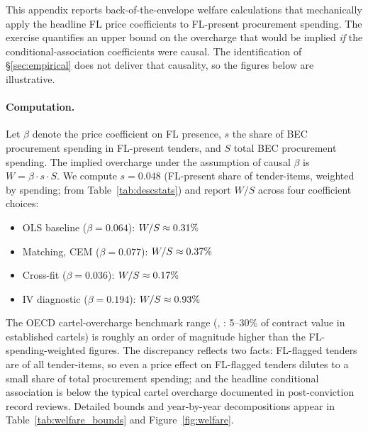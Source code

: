 This appendix reports back-of-the-envelope welfare calculations
that mechanically apply the headline FL price coefficients to
FL-present procurement spending. The exercise quantifies an
upper bound on the overcharge that would be implied \emph{if}
the conditional-association coefficients were causal. The
identification of \S\ref{sec:empirical} does not deliver that
causality, so the figures below are illustrative.

\paragraph{Computation.}
Let $\beta$ denote the price coefficient on FL presence, $s$
the share of BEC procurement spending in FL-present tenders,
and $S$ total BEC procurement spending. The implied overcharge
under the assumption of causal $\beta$ is
$W = \beta \cdot s \cdot S$. We compute $s = 0.048$
(FL-present share of tender-items, weighted by spending; from
Table~\ref{tab:descstats}) and report $W/S$ across four
coefficient choices:

\begin{itemize}
\item OLS baseline ($\beta = 0.064$): $W/S \approx 0.31\%$
\item Matching, CEM ($\beta = 0.077$): $W/S \approx 0.37\%$
\item Cross-fit ($\beta = 0.036$): $W/S \approx 0.17\%$
\item IV diagnostic ($\beta = 0.194$): $W/S \approx 0.93\%$
\end{itemize}

The OECD cartel-overcharge benchmark range
(\citealt{connor2007price}, \citealt{oecd2019government}: 5--30\%
of contract value in established cartels) is roughly an order
of magnitude higher than the FL-spending-weighted figures.
The discrepancy reflects two facts: FL-flagged tenders are
\valCartelMarkup of all tender-items, so even a \valPctSixfour price effect on
FL-flagged tenders dilutes to a small share of total
procurement spending; and the headline conditional association
is below the typical cartel overcharge documented in
post-conviction record reviews. Detailed bounds and
year-by-year decompositions appear in
Table~\ref{tab:welfare_bounds} and
Figure~\ref{fig:welfare}.

